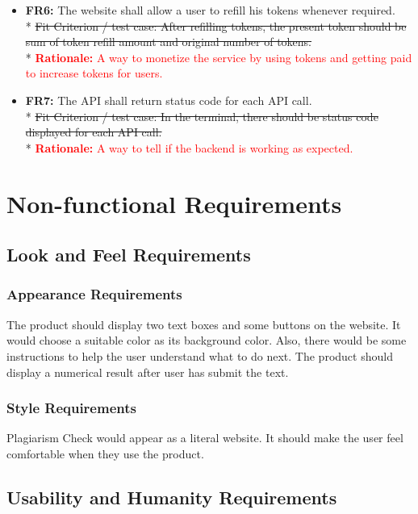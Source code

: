 \documentclass[12pt, titlepage]{article}
\begin{document}
\begin{itemize}
  \item \textbf{FR6:} The website shall allow a user to refill his tokens whenever required. \\*
  \st{Fit Criterion / test case: After refilling tokens, the present token should be sum of token refill amount and original number of tokens.} \\*
  \textcolor{red}{\textbf{Rationale:} A way to monetize the service by using tokens and getting paid to increase tokens for users.}
  
  \item \textbf{FR7:} The API shall return status code for each API call.  \\*
  \st{Fit Criterion / test case: In the terminal, there should be status code displayed for each API call.} \\*
  \textcolor{red}{\textbf{Rationale:} A way to tell if the backend is working as expected.}
\end{itemize}


\section{Non-functional Requirements}
\subsection{Look and Feel Requirements}
\subsubsection{Appearance Requirements}
The product should display two text boxes and some buttons on the website. It would choose a suitable color as its background color. Also, there would be some instructions to help the user understand what to do next. The product should display a numerical result after user has submit the text.


\subsubsection{Style Requirements}
Plagiarism Check would appear as a literal website. It should make the user feel comfortable when they use the product.


\subsection{Usability and Humanity Requirements}
\end{document}
